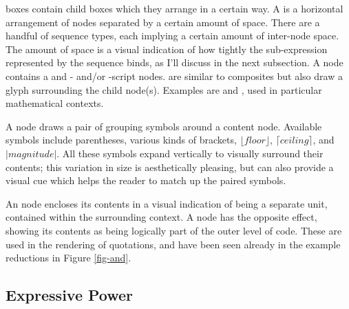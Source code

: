 %  
%  

  

 boxes contain child boxes which they arrange in a certain way. A  is a horizontal arrangement of nodes separated by a certain amount of space. There are a handful of sequence types, each implying a certain amount of inter-node space. The amount of space is a visual indication of how tightly the sub-expression represented by the sequence binds, as I'll discuss in the next subsection. A  node contains a  and - and/or -script nodes.  are similar to composites but also draw a glyph surrounding the child node(s). Examples are  and , used in particular mathematical contexts.

A  node draws a pair of grouping symbols around a content node. Available symbols include parentheses, various kinds of brackets, $\lfloor\mathit{floor}\rfloor$, $\lceil\mathit{ceiling}\rceil$, and $|\mathit{magnitude}|$. All these symbols expand vertically to visually surround their contents; this variation in size is aesthetically pleasing, but can also provide a visual cue which helps the reader to match up the paired symbols.

An  node encloses its contents in a visual indication of being a separate unit, contained within the surrounding context. A  node has the opposite effect, showing its contents as being logically part of the outer level of code. These are used in the rendering of quotations, and have been seen already in the example reductions in Figure \ref{fig-and}.


\subsection{Expressive Power}

